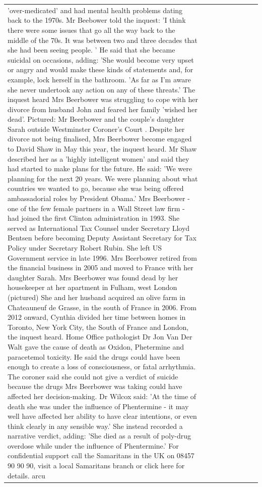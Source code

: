 \begin{table}[H]
\begin{tabular}{lllrlllll}
'over-medicated' and had mental health problems dating back to the 1970s. Mr Beebower told the inquest: 'I think there were some issues that go all the way back to the middle of the 70s. It was between two and three decades that she had been seeing people. ' He said that she became suicidal on occasions, adding: 'She would become very upset or angry and would make these kinds of statements and, for example, lock herself in the bathroom. 'As far as I'm aware she never undertook any action on any of these threats.' The inquest heard Mrs Beerbower was struggling to cope with her divorce from husband John and feared her family 'wished her dead'. Pictured: Mr Beerbower and the couple's daughter Sarah outside Westminster Coroner's Court . Despite her divorce not being finalised, Mrs Beerbower become engaged to David Shaw in May this year, the inquest heard. Mr Shaw described her as a 'highly intelligent women' and said they had started to make plans for the future. He said: 'We were planning for the next 20 years. We were planning about what countries we wanted to go, because she was being offered ambassadorial roles by President Obama.' Mrs Beerbower - one of the few female partners in a Wall Street law firm - had joined the first Clinton administration in 1993. She served as International Tax Counsel under Secretary Lloyd Bentsen before becoming Deputy Assistant Secretary for Tax Policy under Secretary Robert Rubin. She left US Government service in late 1996. Mrs Beerbower retired from the financial business in 2005 and moved to France with her daughter Sarah. Mrs Beerbower was found dead by her housekeeper at her apartment in Fulham, west London (pictured) She and her husband acquired an olive farm in Chateauneuf de Grasse, in the south of France in 2006. From 2012 onward, Cynthia divided her time between homes in Toronto, New York City, the South of France and London, the inquest heard. Home Office pathologist Dr Jon Van Der Walt gave the cause of death as Oxidon, Phetermine and paracetemol toxicity. He said the drugs could have been enough to create a loss of consciousness, or fatal arrhythmia. The coroner said she could not give a verdict of suicide because the drugs Mrs Beerbower was taking could have affected her decision-making. Dr Wilcox said: 'At the time of death she was under the influence of Phentermine - it may well have affected her ability to have clear intentions, or even think clearly in any sensible way.' She instead recorded a narrative verdict, adding: 'She died as a result of poly-drug overdose while under the influence of Phentermine.' For confidential support call the Samaritans in the UK on 08457 90 90 90, visit a local Samaritans branch or click here for details. arcu \\

\end{tabular}
\end{table}
